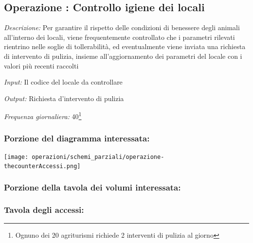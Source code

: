 \documentclass[12pt,a4paper]{article}
\begin{document}
\subsection*{Operazione \thecounterAccessi{}: Controllo igiene dei locali}
\noindent\textit{Descrizione:} Per garantire il rispetto delle condizioni di benessere degli animali all'interno dei locali, viene frequentemente controllato che i parametri rilevati rientrino nelle soglie di tollerabilità, ed eventualmente viene inviata una richiesta di intervento di pulizia, insieme all'aggiornamento dei parametri del locale con i valori più recenti raccolti

\noindent\textit{Input:} Il codice del locale da controllare

\noindent\textit{Output:} Richiesta d'intervento di pulizia

\noindent\textit{Frequenza giornaliera:} 40\footnote{Ognuno dei 20 agriturismi richiede 2 interventi di pulizia al giorno}

\subsubsection*{Porzione del diagramma interessata:}

\texttt{[image: operazioni/schemi\_parziali/operazione-\\thecounterAccessi.png]} 
\subsubsection*{Porzione della tavola dei volumi interessata:}

\subsubsection*{Tavola degli accessi:}
\end{document}

